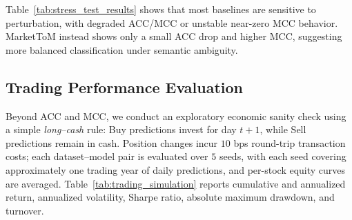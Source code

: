 \documentclass[a4paper,fleqn,doubleblind]{cas-sc}
\newcommand{\revise}[1]{{\color{blue}#1}}
\begin{document}
Table~\ref{tab:stress_test_results} shows that most baselines are sensitive to perturbation, with degraded ACC/MCC or unstable near-zero MCC behavior. MarketToM instead shows only a small ACC drop and higher MCC, suggesting more balanced classification under semantic ambiguity.


\revise{
\subsection{Trading Performance Evaluation}
\label{sec:trading_simulation}
Beyond ACC and MCC, we conduct an exploratory economic sanity check using a simple \emph{long--cash} rule: Buy predictions invest for day $t+1$, while Sell predictions remain in cash. Position changes incur $10$ bps round-trip transaction costs; each dataset--model pair is evaluated over $5$ seeds, with each seed covering approximately one trading year of daily predictions, and per-stock equity curves are averaged. Table~\ref{tab:trading_simulation} reports cumulative and annualized return, annualized volatility, Sharpe ratio, absolute maximum drawdown, and turnover.

}
\end{document}
